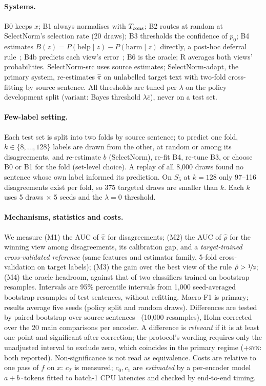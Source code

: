 \paragraph{Systems.}
B0 keeps $x$; B1 always normalises with $T_{\rm cons}$; B2 routes at random at SelectNorm's selection rate (20 draws); B3 thresholds the confidence of $p_0$; B4 estimates $B(z)=P(\text{help}\mid z)-P(\text{harm}\mid z)$ directly, a post-hoc deferral rule~\cite{jitkrittum2023cascade}; B4b predicts each view's error~\cite{kim2020learningloss}; B6 is the oracle; R averages both views' probabilities. SelectNorm-src uses source estimates; SelectNorm-adapt, the primary system, re-estimates $\hat\pi$ on unlabelled target text with two-fold cross-fitting by source sentence. All thresholds are tuned per $\lambda$ on the policy development split (variant: Bayes threshold $\lambda\bar c$), never on a test set.

\paragraph{Few-label setting.}
Each test set is split into two folds by source sentence; to predict one fold, $k\in\{8,\ldots,128\}$ labels are drawn from the other, at random or among its disagreements, and re-estimate $b$ (SelectNorm), re-fit B4, re-tune B3, or choose B0 or B1 for the fold (set-level choice). A replay of all 8{,}000 draws found no sentence whose own label informed its prediction. On $S_5$ at $k{=}128$ only 97--116 disagreements exist per fold, so 375 targeted draws are smaller than $k$. Each $k$ uses 5 draws $\times$ 5 seeds and the $\lambda=0$ threshold.

\paragraph{Mechanisms, statistics and costs.}
We measure (M1) the AUC of $\hat\pi$ for disagreements; (M2) the AUC of $\hat\rho$ for the winning view among disagreements, its calibration gap, and a \emph{target-trained cross-validated reference} (same features and estimator family, 5-fold cross-validation on target labels); (M3) the gain over the best view of the rule $\hat\rho>\nicefrac12$; (M4) the oracle headroom, against that of two classifiers trained on bootstrap resamples. Intervals are 95\% percentile intervals from 1{,}000 seed-averaged bootstrap resamples of test sentences, without refitting. Macro-F1 is primary; results average five seeds (policy split and random draws). Differences are tested by paired bootstrap over source sentences~\cite{koehn2004bootstrap,dror2018hitchhiker} (10{,}000 resamples), Holm-corrected over the 20 main comparisons per encoder. A difference is \emph{relevant} if it is at least one point and significant after correction; the protocol's wording requires only the unadjusted interval to exclude zero, which coincides in the primary regime (\textsc{+syn}: both reported). Non-significance is not read as equivalence. Costs are relative to one pass of $f$ on $x$: $c_T$ is measured; $c_0,c_1$ are \emph{estimated} by a per-encoder model $a+b\cdot\text{tokens}$ fitted to batch-1 CPU latencies and checked by end-to-end timing.

